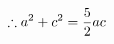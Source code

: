 \documentclass[preview]{standalone}
\begin{document}
\begin{align*}
\special{dvisvgm:raw <g id='unique000'>}\therefore a^2+c^2=\frac{5}{2}ac\special{dvisvgm:raw </g>}
\end{align*}
\end{document}
